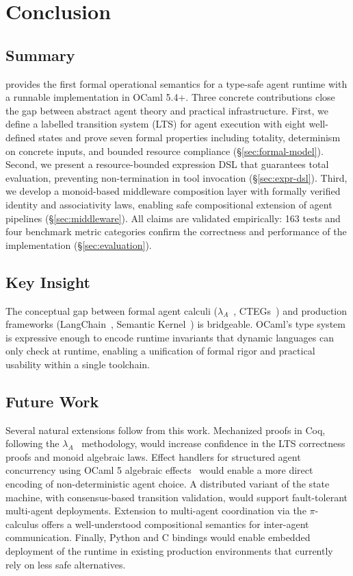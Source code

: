 \section{Conclusion}\label{sec:conclusion}

\subsection{Summary}

\PAR{} provides the first formal operational semantics for a type-safe agent runtime with a runnable implementation in OCaml 5.4+.
Three concrete contributions close the gap between abstract agent theory and practical infrastructure.
First, we define a labelled transition system (LTS) for agent execution with eight well-defined states and prove seven formal properties including totality, determinism on concrete inputs, and bounded resource compliance (\S\ref{sec:formal-model}).
Second, we present a resource-bounded expression DSL that guarantees total evaluation, preventing non-termination in tool invocation (\S\ref{sec:expr-dsl}).
Third, we develop a monoid-based middleware composition layer with formally verified identity and associativity laws, enabling safe compositional extension of agent pipelines (\S\ref{sec:middleware}).
All claims are validated empirically: 163 tests and four benchmark metric categories confirm the correctness and performance of the implementation (\S\ref{sec:evaluation}).

\subsection{Key Insight}

The conceptual gap between formal agent calculi ($\lambda_A$~\cite{lambda-a}, CTEGs~\cite{ctegs}) and production frameworks (LangChain~\cite{langchain}, Semantic Kernel~\cite{semantic-kernel}) is bridgeable.
OCaml's type system is expressive enough to encode runtime invariants that dynamic languages can only check at runtime, enabling a unification of formal rigor and practical usability within a single toolchain.

\subsection{Future Work}

Several natural extensions follow from this work.
Mechanized proofs in Coq, following the $\lambda_A$~\cite{lambda-a} methodology, would increase confidence in the LTS correctness proofs and monoid algebraic laws.
Effect handlers for structured agent concurrency using OCaml 5 algebraic effects~\cite{algebraic-effects-ocaml} would enable a more direct encoding of non-deterministic agent choice.
A distributed variant of the state machine, with consensus-based transition validation, would support fault-tolerant multi-agent deployments.
Extension to multi-agent coordination via the $\pi$-calculus offers a well-understood compositional semantics for inter-agent communication.
Finally, Python and C bindings would enable embedded deployment of the runtime in existing production environments that currently rely on less safe alternatives.